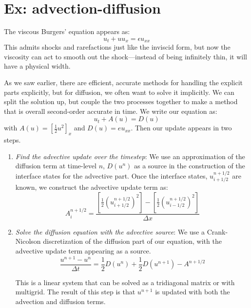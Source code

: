 \section{Ex: advection-diffusion}

\label{ch:multiphysics:sec:adburgers}

The viscous Burgers' equation appears as:
\begin{equation}
u_t + u u_x = \epsilon u_{xx}
\end{equation}
This admits shocks and rarefactions just like the inviscid form, but now
the viscosity can act to smooth out the shock---instead of being
infinitely thin, it will have a physical width.

As we saw earlier, there are efficient, accurate methods for handling
the explicit parts explicitly, but for diffusion, we often want to 
solve it implicitly.  We can split the solution up, but couple the 
two processes together to make a method that is overall second-order
accurate in time.  We write our equation as:
\begin{equation}
u_t + A(u) = D(u)
\end{equation}
with $A(u) = [\frac{1}{2} u^2]_x$ and $D(u) = eu_{xx}$.  Then our update 
appears in two steps.
\begin{enumerate}
\item {\em Find the advective update over the timestep}:
   We use an approximation of the diffusion term at time-level $n$, $D(u^n)$
   as a source in the construction of the interface states for the 
   advective part.  Once the interface states, $u_{i+1/2}^{n+1/2}$ are
   known, we construct the advective update term as:
   \begin{equation}
   A_i^{n+1/2} = 
     \frac{\left [ \frac{1}{2} \left (u_{i+1/2}^{n+1/2}\right)^2\right ] -
           \left [ \frac{1}{2} \left (u_{i-1/2}^{n+1/2}\right)^2\right ]}
          {\Delta x}
    \end{equation}

\item {\em Solve the diffusion equation with the advective source}:
    We use a Crank-Nicolson discretization of the diffusion part of 
    our equation, with the advective update term appearing as a source.
    \begin{equation}
    \frac{u^{n+1} - u^n}{\Delta t} = 
        \frac{1}{2}D(u^n) + \frac{1}{2}D(u^{n+1}) - A^{n+1/2}
    \end{equation}
    
    This is a linear system that can be solved as a tridiagonal matrix
    or with multigrid.  The result of this step is that $u^{n+1}$ is
    updated with both the advection and diffusion terms.

\end{enumerate}

